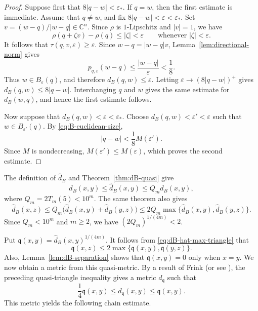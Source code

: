 \documentclass[11pt]{article}
\theoremstyle{definition}
\newcommand{\C}{\mathbb{C}}
\newcommand{\eps}{\varepsilon}
\begin{document}
\begin{proof}

	Suppose first that \(8|q-w|<\eps_*\).  If \(q=w\), then
	the first estimate is immediate.  Assume that \(q\ne w\),
	and fix
	\(8|q-w|<\eps<\eps_*\).
	Set \(v=(w-q)/|w-q|\in\C^n\).
	Since \(\rho\) is \(1\)-Lipschitz and \(|v|=1\), we have
	\[
	\rho(q+\zeta v)-\rho(q)
	\le
	|\zeta|
	<
	\eps
	\qquad\text{whenever }|\zeta|<\eps.
	\]
	It follows that
	\(\tau(q,v,\eps)\ge\eps\).
	Since \(w-q=|w-q|v\), Lemma~\ref{lem:directional-norm} gives
	\[
	p_{q,\eps}(w-q)
	\le
	\frac{|w-q|}{\eps}
	<
	\frac18.
	\]
	Thus \(w\in B_\eps(q)\), and therefore
	\(d_B(q,w)\le\eps\).
	Letting \(\eps\to(8|q-w|)^+\) gives
	\(d_B(q,w)\le8|q-w|\).
	Interchanging \(q\) and \(w\) gives the same estimate for
	\(d_B(w,q)\), and hence the first estimate follows.
	
	Now suppose that \(d_B(q,w)<\eps<\eps_*\).  Choose
	\(d_B(q,w)<\eps'<\eps\)
	such that \(w\in B_{\eps'}(q)\).  By
	\eqref{eq:B-euclidean-size},
	\[
	|q-w|
	<
	\frac18M(\eps').
	\]
	Since \(M\) is nondecreasing,
	\(M(\eps')\le M(\eps)\),
	which proves the second estimate.
\end{proof}







The definition of \(\widehat d_B\) and
Theorem~\ref{thm:dB-quasi} give
\begin{equation}\label{eq:dB-hat-comparison}
 d_B(x,y)
 \le
 \widehat d_B(x,y)
 \le
 Q_m d_B(x,y),
\end{equation}
where \(Q_m=2T_m(5)<10^m\).  The same theorem also gives
\begin{equation}\label{eq:dB-hat-max-triangle}
 \widehat d_B(x,z)
 \le
 Q_m\bigl(
   \widehat d_B(x,y)+\widehat d_B(y,z)
 \bigr)
 \le
 2Q_m
 \max\{\widehat d_B(x,y),\widehat d_B(y,z)\}.
\end{equation}
Since \(Q_m<10^m\) and \(m\ge2\), we have
\((2Q_m)^{1/(4m)}<2\).

Put \(\mathfrak q(x,y)=\widehat d_B(x,y)^{1/(4m)}\).
It follows from \eqref{eq:dB-hat-max-triangle}  that
\[
	\mathfrak q(x,z)\le2\max\{\mathfrak q(x,y),\mathfrak q(y,z)\}.
\]
Also, Lemma~\ref{lem:dB-separation} shows that \(\mathfrak q(x,y)=0\) only when
\(x=y\).
We now obtain a metric from this quasi-metric.  By a result of Frink
\cite{Frink1937} (or see \cite[Theorem~1.2]{Schroeder}),
the preceding quasi-triangle inequality gives a metric
\(d_{\mathfrak q}\) such that
\[
\frac14\mathfrak q(x,y)\le d_{\mathfrak q}(x,y)\le \mathfrak q(x,y).
\]
This metric yields the following chain estimate.
\end{document}
